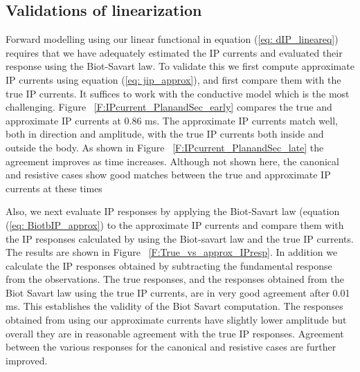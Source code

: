\documentclass[extra,mreferee]{gji}
\begin{document}
\subsection{Validations of linearization}
Forward modelling using our linear functional in equation (\ref{eq: dIP_lineareq}) requires that we have adequately estimated the IP currents and evaluated their response using the Biot-Savart law. To validate this we first compute approximate IP currents using equation (\ref{eq: jip_approx}), and first compare them with the true IP currents. It suffices to work with the conductive model which is the most challenging. Figure ~\ref{F:IPcurrent_PlanandSec_early} compares the true and approximate IP currents at 0.86 ms. The approximate IP currents match well, both in direction and amplitude, with the true IP currents both inside and outside the body. As shown in Figure ~\ref{F:IPcurrent_PlanandSec_late} the agreement improves as time increases. Although not shown here, the canonical and resistive cases show good matches between the true and approximate IP currents at these times

Also, we next evaluate IP responses by applying the Biot-Savart law (equation (\ref{eq: BiotbIP_approx}) to the approximate IP currents and compare them with the IP responses calculated by using the Biot-savart law and the true IP currents. The results are shown in Figure ~\ref{F:True_vs_approx_IPresp}. In addition we calculate the IP responses obtained by subtracting the fundamental response from the observations. The true responses, and the responses obtained from the Biot Savart law using the true IP currents, are in very good agreement after 0.01 ms. This establishes the validity of the Biot Savart computation. The responses obtained from using our approximate currents have slightly lower amplitude but overall they are in reasonable agreement with the true IP responses. Agreement between the various responses for the canonical and resistive cases are further improved.

\end{document}
